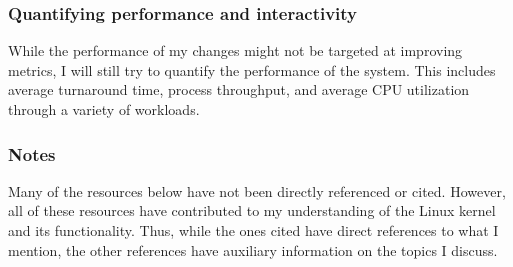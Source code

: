 \documentclass[12pt]{article}
\def\ind{\hspace*{0.3in}}
\begin{document}
\subsubsection*{Quantifying performance and interactivity}

\ind While the performance of my changes might not be targeted at improving metrics, I will still try to quantify the performance of the system. This includes average turnaround time, process throughput, and average CPU utilization through a variety of workloads.

\subsubsection*{Notes}

\ind Many of the resources below have not been directly referenced or cited. However, all of these resources have contributed to my understanding of the Linux kernel and its functionality. Thus, while the ones cited have direct references to what I mention, the other references have auxiliary information on the topics I discuss.

\nocite{*}
\raggedright


\end{document}
